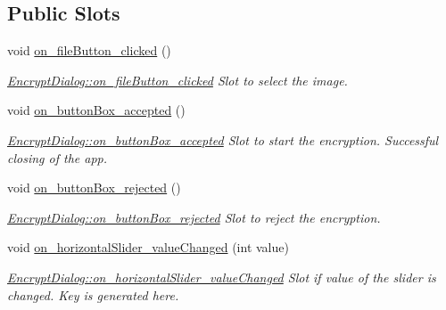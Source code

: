 \subsection*{Public Slots}
\begin{DoxyCompactItemize}
\item 
void \mbox{\hyperlink{class_encrypt_dialog_ac9817d3f11f44f4bb8d97a228fbdf8a5}{on\+\_\+file\+Button\+\_\+clicked}} ()
\begin{DoxyCompactList}\small\item\em \mbox{\hyperlink{class_encrypt_dialog_ac9817d3f11f44f4bb8d97a228fbdf8a5}{Encrypt\+Dialog\+::on\+\_\+file\+Button\+\_\+clicked}} Slot to select the image. \end{DoxyCompactList}\item 
void \mbox{\hyperlink{class_encrypt_dialog_a9a998acd37db458eede31f4a9cb16b78}{on\+\_\+button\+Box\+\_\+accepted}} ()
\begin{DoxyCompactList}\small\item\em \mbox{\hyperlink{class_encrypt_dialog_a9a998acd37db458eede31f4a9cb16b78}{Encrypt\+Dialog\+::on\+\_\+button\+Box\+\_\+accepted}} Slot to start the encryption. Successful closing of the app. \end{DoxyCompactList}\item 
void \mbox{\hyperlink{class_encrypt_dialog_a43deb5fd2be501f4d03582a8ed49e9c2}{on\+\_\+button\+Box\+\_\+rejected}} ()
\begin{DoxyCompactList}\small\item\em \mbox{\hyperlink{class_encrypt_dialog_a43deb5fd2be501f4d03582a8ed49e9c2}{Encrypt\+Dialog\+::on\+\_\+button\+Box\+\_\+rejected}} Slot to reject the encryption. \end{DoxyCompactList}\item 
void \mbox{\hyperlink{class_encrypt_dialog_a48c33063066fdbd61e2c87f08a5cfd60}{on\+\_\+horizontal\+Slider\+\_\+value\+Changed}} (int value)
\begin{DoxyCompactList}\small\item\em \mbox{\hyperlink{class_encrypt_dialog_a48c33063066fdbd61e2c87f08a5cfd60}{Encrypt\+Dialog\+::on\+\_\+horizontal\+Slider\+\_\+value\+Changed}} Slot if value of the slider is changed. Key is generated here. \end{DoxyCompactList}\end{DoxyCompactItemize}
